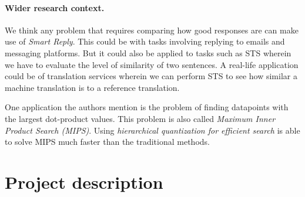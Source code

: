 \documentclass{article}
\begin{document}
\paragraph{Wider research context.}

We think any problem that requires comparing how good responses are can make use of \textit{Smart Reply}. This could be with tasks involving replying to emails and messaging platforms. But it could also be applied to tasks such as STS wherein we have to evaluate the level of similarity of two sentences. A real-life application could be of translation services wherein we can perform STS to see how similar a machine translation is to a reference translation.

One application the authors mention is the problem of finding datapoints with the largest dot-product values. This problem is also called \textit{Maximum Inner Product Search (MIPS)}. Using \textit{hierarchical quantization for efficient search} is able to solve MIPS much faster than the traditional methods.

\section{Project description}
\end{document}
